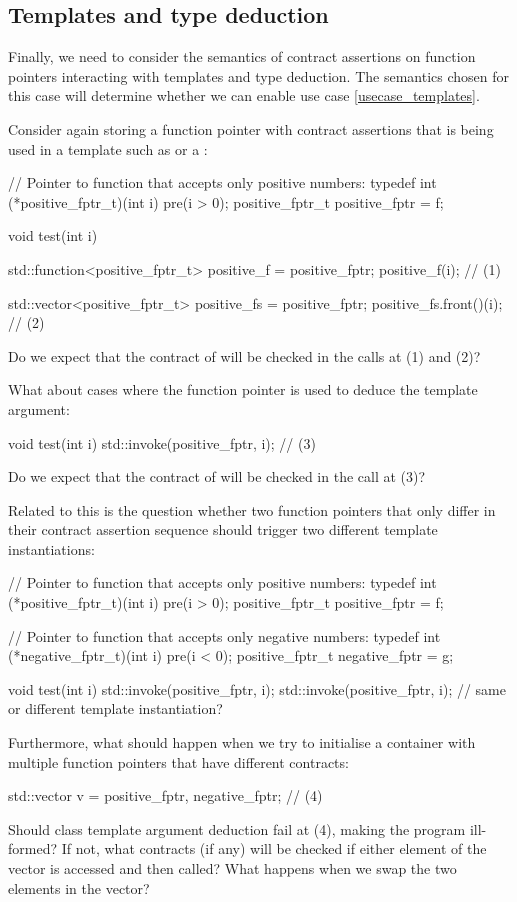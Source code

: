 
\subsection{Templates and type deduction}
\label{semantic_templates}

Finally, we need to consider the semantics of contract assertions on function pointers interacting with templates and type deduction. The semantics chosen for this case will determine whether we can enable use case \ref{usecase_templates}.

Consider again storing a function pointer with contract assertions that is being used in a template such as  or a :
\begin{codeblock}
// Pointer to function that accepts only positive numbers:
typedef int (*positive_fptr_t)(int i) pre(i > 0);
positive_fptr_t positive_fptr = f;

void test(int i) {
  std::function<positive_fptr_t> positive_f = positive_fptr;
  positive_f(i);  // (1)
  
  std::vector<positive_fptr_t> positive_fs = {positive_fptr};
  positive_fs.front()(i);  // (2)
}
\end{codeblock}
Do we expect that the contract of  will be checked in the calls at (1) and (2)?

What about cases where the function pointer is used to deduce the template argument:
\begin{codeblock}
void test(int i) {
  std::invoke(positive_fptr, i);  // (3)
}
\end{codeblock}
Do we expect that the contract of  will be checked in the call at (3)?

Related to this is the question whether two function pointers that only differ in their contract assertion sequence should trigger two different template instantiations:
\begin{codeblock}
// Pointer to function that accepts only positive numbers:
typedef int (*positive_fptr_t)(int i) pre(i > 0);
positive_fptr_t positive_fptr = f;

// Pointer to function that accepts only negative numbers:
typedef int (*negative_fptr_t)(int i) pre(i < 0);
positive_fptr_t negative_fptr = g;

void test(int i) {
  std::invoke(positive_fptr, i);
  std::invoke(positive_fptr, i);  // same or different template instantiation?
}
\end{codeblock}
Furthermore, what should happen when we try to initialise a container with multiple function pointers that have different contracts:
\begin{codeblock}
std::vector v = {positive_fptr, negative_fptr};  // (4)
\end{codeblock}
Should class template argument deduction fail at (4), making the program ill-formed? If not, what contracts (if any) will be checked if either element of the vector is accessed and then called? What happens when we swap the two elements in the vector?

